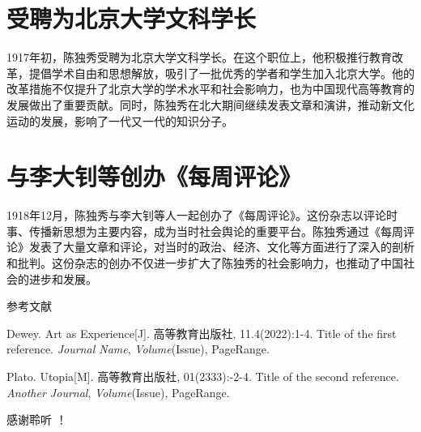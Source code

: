 \documentclass[10pt,a4paper]{beamer} %
\begin{document}
	\section{受聘为北京大学文科学长}
	\begin{frame}
		1917年初，陈独秀受聘为北京大学文科学长。在这个职位上，他积极推行教育改革，提倡学术自由和思想解放，吸引了一批优秀的学者和学生加入北京大学。他的改革措施不仅提升了北京大学的学术水平和社会影响力，也为中国现代高等教育的发展做出了重要贡献。同时，陈独秀在北大期间继续发表文章和演讲，推动新文化运动的发展，影响了一代又一代的知识分子。
	\end{frame}
	\section{与李大钊等创办《每周评论》}
	\begin{frame}
		1918年12月，陈独秀与李大钊等人一起创办了《每周评论》。这份杂志以评论时事、传播新思想为主要内容，成为当时社会舆论的重要平台。陈独秀通过《每周评论》发表了大量文章和评论，对当时的政治、经济、文化等方面进行了深入的剖析和批判。这份杂志的创办不仅进一步扩大了陈独秀的社会影响力，也推动了中国社会的进步和发展。
	\end{frame}
	
	
	\appendix
	\begin{frame}{参考文献}
		\begin{thebibliography}{99} %
			Dewey. Art as Experience[J]. 高等教育出版社, 11.4(2022):1-4.
			\newblock Title of the first reference.
			\newblock \emph{Journal Name}, \emph{Volume}(Issue), PageRange.
			
			Plato. Utopia[M]. 高等教育出版社, 01(2333):-2-4.
			\newblock Title of the second reference.
			\newblock \emph{Another Journal}, \emph{Volume}(Issue), PageRange.
		\end{thebibliography}
		
		
	\end{frame}
	
	\begin{frame}[plain,c]
		\begin{center}
			\Huge 感谢聆听 ！
		\end{center}
	\end{frame}
	
\end{document}

